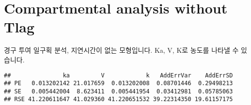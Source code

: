\documentclass[
  9pt,
]{krantz}
\newenvironment{Shaded}{\begin{snugshade}}{\end{snugshade}}
\newcommand{\CommentTok}[1]{\textcolor[rgb]{0.56,0.35,0.01}{\textit{#1}}}
\newcommand{\ControlFlowTok}[1]{\textcolor[rgb]{0.13,0.29,0.53}{\textbf{#1}}}
\newcommand{\DataTypeTok}[1]{\textcolor[rgb]{0.13,0.29,0.53}{#1}}
\newcommand{\DecValTok}[1]{\textcolor[rgb]{0.00,0.00,0.81}{#1}}
\newcommand{\FloatTok}[1]{\textcolor[rgb]{0.00,0.00,0.81}{#1}}
\newcommand{\KeywordTok}[1]{\textcolor[rgb]{0.13,0.29,0.53}{\textbf{#1}}}
\newcommand{\NormalTok}[1]{#1}
\newcommand{\OperatorTok}[1]{\textcolor[rgb]{0.81,0.36,0.00}{\textbf{#1}}}
\newcommand{\StringTok}[1]{\textcolor[rgb]{0.31,0.60,0.02}{#1}}
\begin{document}
\hypertarget{compartmental-analysis-without-tlag}{%
\section{Compartmental analysis without Tlag}\label{compartmental-analysis-without-tlag}}

경구 투여 일구획 분석, 지연시간이 없는 모형입니다. Ka, V, K로 농도를 나타낼 수 있습니다.

\begin{Shaded}
\end{Shaded}

\begin{verbatim}
##               ka         V            k   AddErrVar    AddErrSD
## PE   0.013202142 21.017659  0.013202008  0.08701446  0.29498213
## SE   0.005442004  8.623411  0.005441954  0.03412981  0.05785063
## RSE 41.220611647 41.029360 41.220651532 39.22314350 19.61157175
\end{verbatim}
\end{document}
